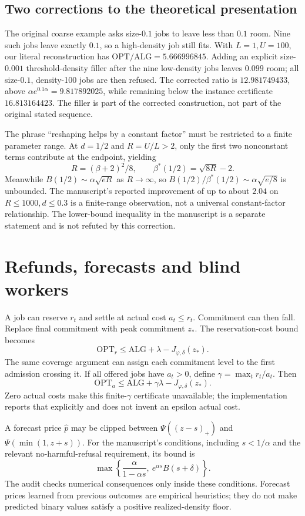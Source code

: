 \documentclass[11pt]{article}
\newcommand{\ALG}{\mathrm{ALG}}\newcommand{\OPT}{\mathrm{OPT}}
\begin{document}
\subsection{Two corrections to the theoretical presentation}
The original coarse example asks size-$0.1$ jobs to leave less than $0.1$ room. Nine such jobs leave exactly $0.1$, so a high-density job still fits. With $L=1,U=100$, our literal reconstruction has $\OPT/\ALG=5.666996845$. Adding an explicit size-$0.001$ threshold-density filler after the nine low-density jobs leaves $0.099$ room; all size-$0.1$, density-100 jobs are then refused. The corrected ratio is $12.981749433$, above $\alpha e^{0.1\alpha}=9.817892025$, while remaining below the instance certificate $16.813164423$. The filler is part of the corrected construction, not part of the original stated sequence.

The phrase ``reshaping helps by a constant factor'' must be restricted to a finite parameter range. At $d=1/2$ and $R=U/L>2$, only the first two nonconstant terms contribute at the endpoint, yielding
\[R=(\beta+2)^2/8,\qquad\beta^*(1/2)=\sqrt{8R}-2.\]
Meanwhile $B(1/2)\sim\alpha\sqrt{eR}$ as $R\to\infty$, so $B(1/2)/\beta^*(1/2)\sim\alpha\sqrt{e/8}$ is unbounded. The manuscript's reported improvement of up to about $2.04$ on $R\le1000,d\le0.3$ is a finite-range observation, not a universal constant-factor relationship. The lower-bound inequality in the manuscript is a separate statement and is not refuted by this correction.

\section{Refunds, forecasts and blind workers}
A job can reserve $r_t$ and settle at actual cost $a_t\le r_t$. Commitment can then fall. Replace final commitment with peak commitment $z_*$. The reservation-cost bound becomes
\[\OPT_r\le\ALG+\lambda-J_{\varphi,\delta}(z_*).\]
The same coverage argument can assign each commitment level to the first admission crossing it. If all offered jobs have $a_t>0$, define $\gamma=\max_t r_t/a_t$. Then
\[\OPT_a\le\ALG+\gamma\lambda-J_{\varphi,\delta}(z_*).\]
Zero actual costs make this finite-$\gamma$ certificate unavailable; the implementation reports that explicitly and does not invent an epsilon actual cost.

A forecast price $\widehat p$ may be clipped between $\Psi((z-s)_+)$ and $\Psi(\min(1,z+s))$. For the manuscript's conditions, including $s<1/\alpha$ and the relevant no-harmful-refusal requirement, its bound is
\[\max\left\{\frac{\alpha}{1-\alpha s},\ e^{\alpha s}B(s+\delta)\right\}.\]
The audit checks numerical consequences only inside these conditions. Forecast prices learned from previous outcomes are empirical heuristics; they do not make predicted binary values satisfy a positive realized-density floor.
\end{document}
